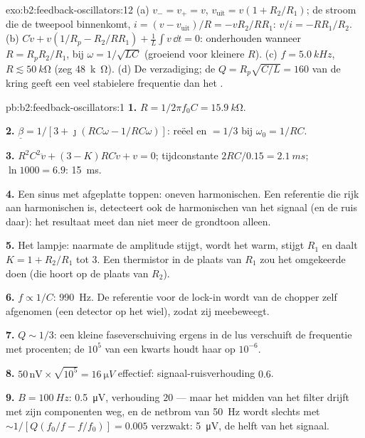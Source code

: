 \begin{solution}{exo:b2:feedback-oscillators:12}
(a) $v_- = v_+ = v$, $v_{\text{uit}} = v(1 + R_2/R_1)$; de stroom die de
tweepool binnenkomt, $i = (v - v_{\text{uit}})/R = -vR_2/RR_1$:
$v/i = -RR_1/R_2$. (b)
$C\dot v +
v(1/R_p - R_2/RR_1) + \frac1L\int v\,\dd t = 0$: onderhouden
wanneer $R = R_pR_2/R_1$, bij $\omega = 1/\sqrt{LC}$ (groeiend voor kleinere
$R$). (c) $f = \qty{5.0}{kHz}$, $R \lesssim
\qty{50}{k\ohm}$ (zeg
\qty{48}{k\ohm}). (d) De verzadiging; de $Q = R_p
\sqrt{C/L} = 160$ van de
kring geeft een veel stabielere frequentie dan het .
\end{solution}

\begin{solution}{pb:b2:feedback-oscillators:1}
\textbf{1.} $R = 1/2\pi f_0C = \qty{15.9}{k\ohm}$.

\textbf{2.} $\underline\beta = 1/[3 + \jmath(RC\omega - 1/RC\omega)]$: reëel
en $= 1/3$ bij $\omega_0 = 1/RC$.

\textbf{3.} $R^2C^2\ddot v + (3 - K)RC\dot v + v = 0$; tijdconstante
$2RC/0.15 =
\qty{2.1}{ms}$; $\ln1000 = 6.9$: \qty{15}{ms}.

\textbf{4.} Een sinus met afgeplatte toppen: oneven harmonischen. Een
referentie die rijk aan harmonischen is, detecteert ook de harmonischen van
het signaal (en de ruis daar): het resultaat meet dan niet meer de grondtoon
alleen.

\textbf{5.} Het lampje: naarmate de amplitude stijgt, wordt het warm, stijgt
$R_1$ en daalt $K = 1 + R_2/R_1$ tot $3$. Een thermistor in de plaats van
$R_1$ zou het omgekeerde doen (die hoort op de plaats van $R_2$).

\textbf{6.} $f \propto 1/C$: \qty{990}{Hz}. De referentie voor de lock-in
wordt van de chopper zelf afgenomen (een detector op het wiel), zodat zij
meebeweegt.

\textbf{7.} $Q \sim 1/3$: een kleine faseverschuiving ergens in de lus
verschuift de frequentie met procenten; de $10^5$ van een kwarts houdt haar
op $10^{-6}$.

\textbf{8.} $50\,\text{nV} \times \sqrt{10^5} = \qty{16}{\micro V}$
effectief: signaal-ruisverhouding $0.6$.

\textbf{9.} $B = \qty{100}{Hz}$: \qty{0.5}{\micro V}, verhouding $20$ ---
maar het midden van het filter drijft met zijn componenten weg, en de
netbrom van \qty{50}{Hz} wordt slechts met
$\sim 1/[Q(f_0/f - f/f_0)] = 0.005$ verzwakt: \qty{5}{\micro V}, de helft
van het signaal.


\end{solution}
